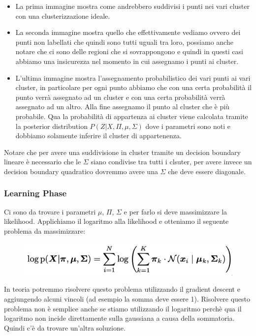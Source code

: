\documentclass[14pt]{extreport}
\begin{document}
\begin{itemize}
	\item La prima immagine mostra come andrebbero suddivisi i punti nei vari cluster con una clusterizzazione ideale.
	\item La seconda immagine mostra quello che effettivamente vediamo ovvero dei punti non labellati che quindi sono tutti uguali tra loro, possiamo
	      anche notare che ci sono delle regioni che si sovrappongono e quindi in questi casi abbiamo una insicurezza nel momento in cui assegnamo i
	      punti ai cluster.
	\item L'ultima immagine mostra l'assegnamento probabilistico dei vari punti ai vari cluster, in particolare per ogni punto abbiamo che con una
	      certa probabilità il punto verrà assegnato ad un cluster e con una certa probabilità verrà assegnato ad un altro. Alla fine assegnamo il
	      punto al cluster che è più probabile. Qua la probabilità di appartenza ai cluster viene calcolata tramite la posterior distribution
	      $P(Z|X,\Pi, \mu, \Sigma)$ dove i parametri sono noti e dobbiamo solamente inferire il cluster di appartenenza.
\end{itemize}



Notare che per avere una suddivisione in cluster tramite un decision boundary lineare è necessario che le $\Sigma$ siano condivise tra tutti i
clsuter, per avere invece un decision boundary quadratico dovremmo avere una $\Sigma$ che deve essere diagonale.

\subsubsection{Learning Phase}

Ci sono da trovare i parametri $\mu$, $\Pi$, $\Sigma$ e per farlo si deve massimizzare la likelihood. Applichiamo il logaritmo alla likelihood e
otteniamo il seguente problema da massimizzare:


\begin{figure}[H]
	\centering
	\includegraphics[width=0.7\linewidth]{548.jpeg}
\end{figure}

In teoria potremmo risolvere questo problema utilizzando il gradient descent e aggiungendo alcuni vincoli (ad esempio la somma deve essere 1).
Risolvere questo problema non è semplice anche se stiamo utilizzando il logaritmo perchè qua il logaritmo non incide direttamente sulla gaussiana a
causa della sommatoria. Quindi c'è da trovare un'altra soluzione.
\end{document}
